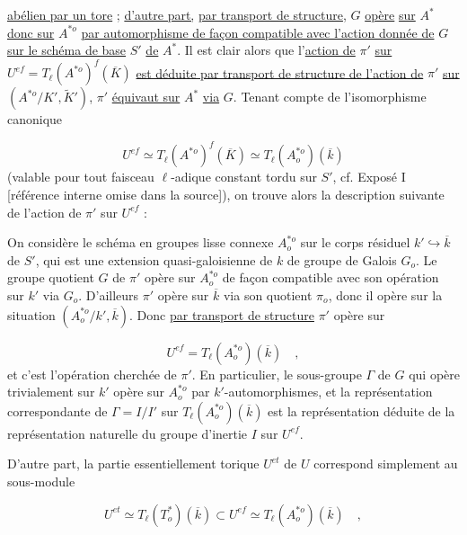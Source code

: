 \underline{abélien par un tore} ; \underline{d'autre part,} \underline{par transport de structure}, $G$ \underline{opère} \underline{sur} $A^*$ \underline{donc sur} $A^{*o}$ \underline{par automorphisme de façon compatible avec l'action donnée de} $G$ \underline{sur le schéma de base} $S'$ \underline{de} $A^*$. Il est clair alors que l'\underline{action de} $\pi'$ \underline{sur} $U^{ef} = T_{\ell}(A^{*o})^{f}(\overline{K})$ \underline{est déduite par transport de structure de l'action de} $\pi'$ \underline{sur} $(A^{*o}/K',\widetilde{K}')$, $\pi'$ \underline{équivaut sur} $A^*$ \underline{via} $G$. Tenant compte de l'isomorphisme canonique

\begin{equation}\tag{4.2.6}
U^{ef} \simeq T_{\ell}(A^{*o})^{f}(\overline{K}) \simeq T_{\ell}(A^{*o}_{o})(\overline{k})
\end{equation}
(valable pour tout faisceau $\ell$-adique constant tordu sur $S'$, cf. Exposé I [référence interne omise dans la source]), on trouve alors la description suivante de l'action de $\pi'$ sur $U^{ef}$ :

On considère le schéma en groupes lisse connexe $A^{*o}_{o}$ sur le corps résiduel $k' \hookrightarrow \overline{k}$ de $S'$, qui est une extension quasi-galoisienne de $k$ de groupe de Galois $G_{o}$. Le groupe quotient $G$ de $\pi'$ opère sur $A^{*o}_{o}$ de façon compatible avec son opération sur $k'$ via $G_{o}$. D'ailleurs $\pi'$ opère sur $\overline{k}$ via son quotient $\pi_{o}$, donc il opère sur la situation $(A^{*o}_{o}/k',\overline{k})$. Donc \underline{par transport de structure} $\pi'$ opère sur

\begin{equation*}
U^{ef} = T_{\ell}(A^{*o}_{o})(\overline{k}) \quad ,
\end{equation*}
et c'est l'opération cherchée de $\pi'$. En particulier, le sous-groupe $\Gamma$ de $G$ qui opère trivialement sur $k'$ opère sur $A^{*o}_{o}$ par $k'$-automorphismes, et la représentation correspondante de $\Gamma = I/I'$ sur $T_{\ell}(A^{*o}_{o})(\overline{k})$ est la représentation déduite de la représentation naturelle du groupe d'inertie $I$ sur $U^{ef}$.

D'autre part, la partie essentiellement torique $U^{et}$ de $U$ correspond simplement au sous-module

\begin{equation}\tag{4.2.7}
U^{et} \simeq T_{\ell}(T^{*}_{o})(\overline{k}) \subset U^{ef} \simeq T_{\ell}(A^{*o}_{o})(\overline{k}) \quad ,
\end{equation}

